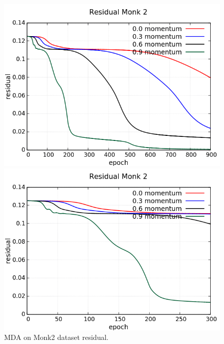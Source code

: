 \begin{figure}[H]
	\centering
	\begin{minipage}[t]{0.5\linewidth}
		\includegraphics[width=\linewidth]{data/MGD/Monk2/M/Monk2_MGD_Residual_standard.png}
	\end{minipage}%
	\begin{minipage}[t]{0.5\linewidth}
		\includegraphics[width=\linewidth]{data/MGD/Monk2/M/Monk2_MGD_Residual_zoom.png}
	\end{minipage}
	\caption{MDA on Monk2 dataset residual.}
\end{figure}
